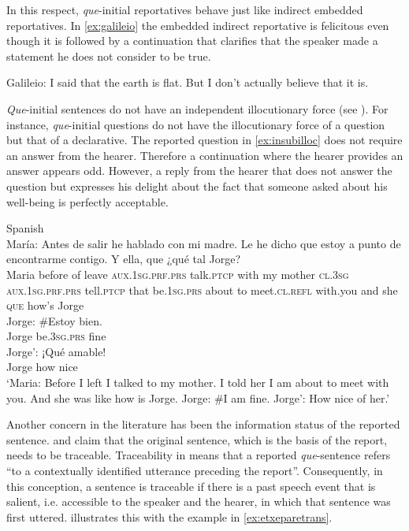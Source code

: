 In this respect, \emph{que}-initial reportatives behave just like indirect embedded reportatives. In \eqref{ex:galileio}  the embedded indirect reportative is felicitous even though it is followed by a continuation that clarifies that the speaker made a statement he does not consider to be true.  

\ea\label{ex:galileio} {\ob}Galileio:{\cb} I said that the earth is flat. But I don't actually believe that it is.
\z



\emph{Que}-initial sentences  do not have an independent illocutionary force (see \citealt{Etxepare2010}). For instance, \emph{que}-initial questions do not have the illocutionary force of a question but that of a declarative.  
The reported question in \eqref{ex:insubilloc} does not require an answer from the hearer. Therefore a continuation where the hearer provides an answer appears odd. However, a reply from the hearer that does not answer the question but expresses his delight about the fact that someone asked about his well-being is perfectly acceptable.

\ea\label{ex:insubilloc}
 Spanish\\ 
\gll María: Antes de salir he hablado con mi madre. Le he dicho que estoy {a punto de} encontrarme contigo. Y ella, que ¿{qué tal} Jorge? \\
	Maria before of leave \textsc{aux.1sg.prf.prs} talk.\textsc{ptcp} with my mother \textsc{cl.3sg} \textsc{aux.1sg.prf.prs} tell.\textsc{ptcp} that be.\textsc{1sg.prs} {about to} meet.\textsc{cl.refl} with.you and she \textsc{que} {how's} Jorge\\
	\exi{}\gll Jorge: \#Estoy bien.\\
	Jorge be.\textsc{3sg.prs} fine\\
	\exi{}\gll Jorge': ¡Qué amable!\\
	Jorge how nice\\
	\glt `Maria: Before I left I talked to my mother. I told her I am about to meet with you. And she was like how is Jorge. Jorge: \#I am fine. Jorge': How nice of her.' 
\z


Another concern  in the literature has been the information status of the reported sentence. \citet{Etxepare2010} and \citet{Corr2016} claim  that the original sentence, which is the basis of the report, needs to be traceable. Traceability in \citet[613]{Etxepare2010}  means that a reported \emph{que}-sentence refers ``to a
contextually identified utterance preceding the report''.  Consequently, in this conception, a sentence is traceable if there is a past speech event that is salient, i.e. accessible to the speaker and the hearer,  in which that sentence was first uttered. \citet{Etxepare2010} illustrates this with the example in \eqref{ex:etxeparetrans}. 

